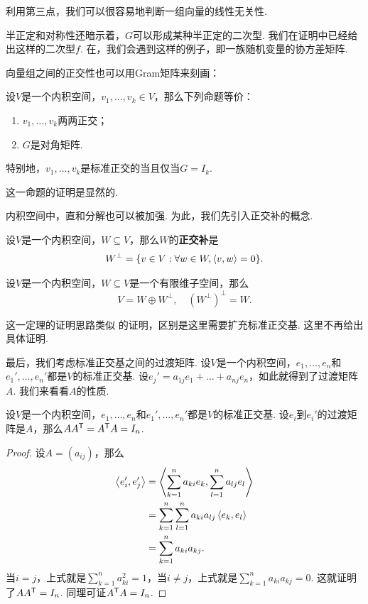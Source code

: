 利用第三点，我们可以很容易地判断一组向量的线性无关性. 

半正定和对称性还暗示着，$G$可以形成某种半正定的二次型. 我们在证明中已经给出这样的二次型$f$. 在，我们会遇到这样的例子，即一族随机变量的协方差矩阵. 

向量组之间的正交性也可以用Gram矩阵来刻画：

\begin{proposition}\label{prop:orthogonal-gram}
设$V$是一个内积空间，$v_1,\dots,v_k\in V$，那么下列命题等价：
\begin{enumerate}
    \item $v_1,\dots,v_k$两两正交；
    \item $G$是对角矩阵. 
\end{enumerate}
特别地，$v_1,\dots,v_k$是标准正交的当且仅当$G=I_k$.
\end{proposition}

这一命题的证明是显然的.

内积空间中，直和分解也可以被加强. 为此，我们先引入正交补的概念. 

\begin{definition}[正交补]\label{def:orthogonal-complement}
设$V$是一个内积空间，$W\subseteq V$，那么$W$的\textbf{正交补}是
\[
    W^\bot=\{v\in V:\forall w\in W,\left\langle{v},{w}\right\rangle=0\}.
\]
\end{definition}

\begin{theorem}\label{prop:orthogonal-complement}
设$V$是一个内积空间，$W\subseteq V$是一个有限维子空间，那么
\[
    V=W\oplus W^\bot,\quad (W^\bot)^\bot=W.
\]
\end{theorem}

这一定理的证明思路类似 的证明，区别是这里需要扩充标准正交基. 这里不再给出具体证明. 

最后，我们考虑标准正交基之间的过渡矩阵. 设$V$是一个内积空间，$e_1,\dots,e_n$和$e_1',\dots,e_n'$都是$V$的标准正交基. 设$e_j'=a_{1j}e_1+\dots+a_{nj}e_n$，如此就得到了过渡矩阵$A$. 我们来看看$A$的性质. 

\begin{proposition}
设$V$是一个内积空间，$e_1,\dots,e_n$和$e_1',\dots,e_n'$都是$V$的标准正交基. 设$e_i$到$e_i'$的过渡矩阵是$A$，那么$AA^{\mathsf{T}}=A^{\mathsf{T}} A=I_n$.
\end{proposition}
\begin{proof}
设$A=(a_{ij})$，那么
\begin{align*}
    \left\langle{e_i'},{e_j'}\right\rangle&=\left\langle{\sum_{k=1}^na_{ki}e_k},{\sum_{l=1}^na_{lj}e_l}\right\rangle \\
    &=\sum_{k=1}^n\sum_{l=1}^na_{ki}a_{lj}\left\langle{e_k},{e_l}\right\rangle \\
    &=\sum_{k=1}^na_{ki}a_{kj}.
\end{align*}
当$i=j$，上式就是$\sum_{k=1}^na_{ki}^2=1$，当$i\neq j$，上式就是$\sum_{k=1}^na_{ki}a_{kj}=0$. 这就证明了$AA^{\mathsf{T}}=I_n$. 同理可证$A^{\mathsf{T}} A=I_n$.
\end{proof}

